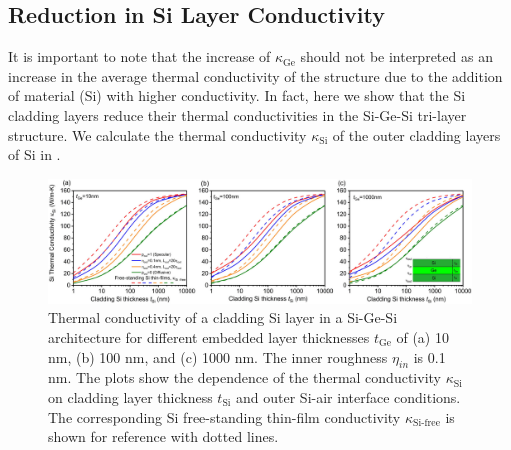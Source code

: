 \subsection{Reduction in Si Layer Conductivity} 
It is important to note that the increase of $\kappa_{\text{Ge}}$ should not be interpreted as an increase in the average thermal conductivity of the structure due to the addition of material (Si) with higher conductivity. In fact, here we show that the Si cladding layers reduce their thermal conductivities in the Si-Ge-Si tri-layer structure. We calculate the thermal conductivity $\kappa_{\text{Si}}$ of the outer cladding layers of Si in . 
\begin{figure}
  \centering \includegraphics[width=1.0\textwidth]{figures/ch5/Fig1-red.jpg}
  \caption{Thermal conductivity of a cladding Si layer in a Si-Ge-Si architecture for different embedded layer thicknesses $t_{\text{Ge}}$ of (a) 10 nm, (b) 100 nm, and (c) 1000 nm. The inner roughness $\eta_{in}$ is 0.1 nm. The plots show the dependence of the thermal conductivity $\kappa_{\text{Si}}$ on cladding layer thickness $t_{\text{Si}}$ and outer Si-air interface conditions. The corresponding Si free-standing thin-film conductivity $\kappa_{\text{Si-free}}$ is shown for reference with dotted lines.}
    \label{fig:ch5-red1}
\end{figure}
